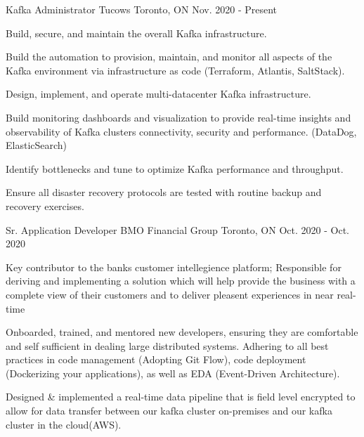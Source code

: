 


\begin{cventries}

\cventry
{Kafka Administrator} %
{Tucows} %
{Toronto, ON} %
{Nov. 2020 - Present} %
{ %
\begin{cvitems}
\item {Build, secure, and maintain the overall Kafka infrastructure.}
\item {Build the automation to provision, maintain, and monitor all aspects of the Kafka environment via infrastructure as code (Terraform, Atlantis, SaltStack).}
\item {Design, implement, and operate multi-datacenter Kafka infrastructure.}
\item {Build monitoring dashboards and visualization to provide real-time insights and observability of Kafka clusters connectivity, security and performance. (DataDog, ElasticSearch)}
\item {Identify bottlenecks and tune to optimize Kafka performance and throughput.}
\item {Ensure all disaster recovery protocols are tested with routine backup and recovery exercises.}
\end{cvitems}
}


\cventry
{Sr. Application Developer} %
{BMO Financial Group} %
{Toronto, ON} %
{Oct. 2020 - Oct. 2020} %
{ %
\begin{cvitems}
\item {Key contributor to the banks customer intellegience platform; Responsible for deriving and implementing a solution which will help provide the business with a complete view of their customers and to deliver pleasent experiences in near real-time} 
\item {Onboarded, trained, and mentored new developers, ensuring they are comfortable and self sufficient in dealing large distributed systems. Adhering to all best practices in code management (Adopting Git Flow), code deployment (Dockerizing your applications), as well as EDA (Event-Driven Architecture).}
\item {Designed \& implemented a real-time data pipeline that is field level encrypted to allow for data transfer between our kafka cluster on-premises and our kafka cluster in the cloud(AWS).}
\end{cvitems}
}


\end{cventries}
